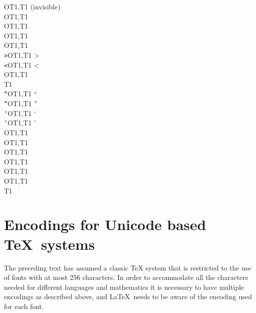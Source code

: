 \documentclass{ltxguide}[1994/11/20]
\newcommand\ttverb[1]{\texttt{\string#1}}
\begin{document}
\begin{tabbing}
\ttverb\textcompwordmark  \>OT1,T1\>   \textcompwordmark\> (invisible) \\
\ttverb\textdollar        \>OT1,T1\>   \textdollar      \>  \\
\ttverb\textemdash        \>OT1,T1\>   \textemdash      \>  \\
\ttverb\textendash        \>OT1,T1\>   \textendash      \>  \\
\ttverb\textexclamdown    \>OT1,T1\>   \textexclamdown  \>  \\
\ttverb\textgreater       \>OT1,T1\>   \textgreater     \>  \\
\ttverb\textless          \>OT1,T1\>   \textless        \>  \\
\ttverb\textquestiondown  \>OT1,T1\>   \textquestiondown\>  \\
\ttverb\textquotedbl      \>T1    \>   \textquotedbl    \>  \\
\ttverb\textquotedblleft  \>OT1,T1\>   \textquotedblleft\>  \\
\ttverb\textquotedblright \>OT1,T1\>   \textquotedblright\> \\
\ttverb\textquoteleft     \>OT1,T1\>   \textquoteleft   \>  \\
\ttverb\textquoteright    \>OT1,T1\>   \textquoteright  \>  \\
\ttverb\textregistered    \>OT1,T1\>   \textregistered  \>  \\
\ttverb\textsection       \>OT1,T1\>   \textsection     \>  \\
\ttverb\textsterling      \>OT1,T1\>   \textsterling    \>  \\
\ttverb\texttrademark     \>OT1,T1\>   \texttrademark   \>  \\
\ttverb\textunderscore    \>OT1,T1\>   \textunderscore  \>  \\
\ttverb\textvisiblespace  \>OT1,T1\>   \textvisiblespace\>  \\
\ttverb\th                \>T1    \>   \th              \>
\end{tabbing}

\section{Encodings for Unicode based \TeX\ systems}
\label{sec:unicode}

The preceding text has assumed a classic TeX system that is
restricted to the use of fonts with at most 256 characters. In order
to accommodate all the characters needed for different languages and
mathematics it is necessary to have multiple encodings as described
above, and \LaTeX\ needs to be aware of the encoding used for each
font.
\end{document}
